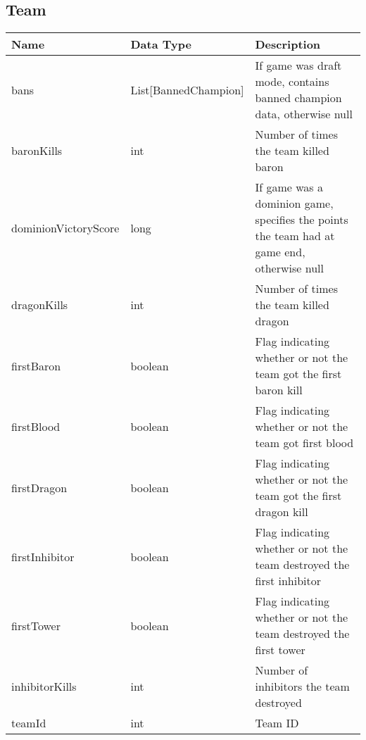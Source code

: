 \subsection{Team}
\begin{table}[!h]
\footnotesize
\centering
\begin{tabular}{llp{5cm}}
\textbf{Name}        & \textbf{Data Type}       & \textbf{Description}                                                                       \\ \hline
bans                 & List{[}BannedChampion{]} & If game was draft mode, contains banned champion data, otherwise null                      \\ \hline
baronKills           & int                      & Number of times the team killed baron                                                      \\ \hline
dominionVictoryScore & long                     & If game was a dominion game, specifies the points the team had at game end, otherwise null \\ \hline
dragonKills          & int                      & Number of times the team killed dragon                                                     \\ \hline
firstBaron           & boolean                  & Flag indicating whether or not the team got the first baron kill                           \\ \hline
firstBlood           & boolean                  & Flag indicating whether or not the team got first blood                                    \\ \hline
firstDragon          & boolean                  & Flag indicating whether or not the team got the first dragon kill                          \\ \hline
firstInhibitor       & boolean                  & Flag indicating whether or not the team destroyed the first inhibitor                      \\ \hline
firstTower           & boolean                  & Flag indicating whether or not the team destroyed the first tower                          \\ \hline
inhibitorKills       & int                      & Number of inhibitors the team destroyed                                                    \\ \hline
teamId               & int                      & Team ID                                                                                    \\ \hline

\end{tabular}
\end{table}
